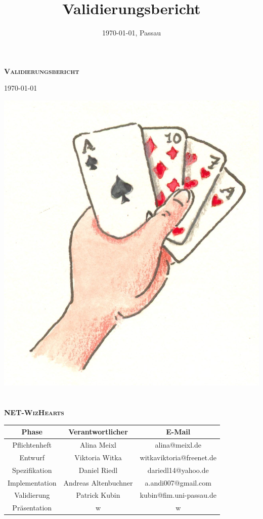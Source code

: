 \documentclass[a4paper]{article}
\title{Validierungsbericht}
\date{\today{}, Passau}
\begin{document}
\begin{titlepage}
\vspace*{3cm}
\begin{center}
\textbf{\textsc{\LARGE Validierungsbericht}}

{\large \today}

\vspace{2cm}
\includegraphics{kartenspiel}
\ \\
\ \\

\textbf{\textsc{\LARGE NET-WizHearts}}
\vspace{2cm}

\begin{tabular}{|c|c|c|}\hline
   Phase & Verantwortlicher & E-Mail \\ \hline\hline
   Pflichtenheft & Alina Meixl &  alina@meixl.de \\ \hline
   Entwurf & Viktoria Witka & witkaviktoria@freenet.de \\ \hline
   Spezifikation & Daniel Riedl & dariedl14@yahoo.de \\ \hline
   Implementation & Andreas Altenbuchner& a.andi007@gmail.com\\ \hline
   Validierung & Patrick Kubin & kubin@fim.uni-passau.de\\ \hline
   Präsentation & w& w\\ \hline
 \end{tabular}
\vspace{2cm}
\\
\end{center}
\end{titlepage}
\tableofcontents
{}
\hypersetup{pageanchor=true}
\end{document}
